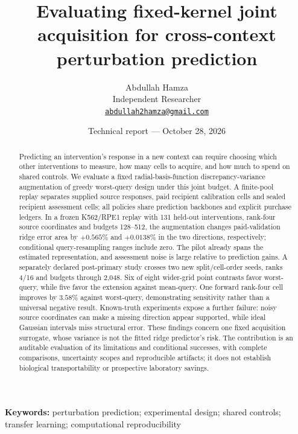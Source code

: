 \documentclass[11pt]{article}
\title{Evaluating fixed-kernel joint acquisition for cross-context perturbation prediction}
\author{Abdullah Hamza\\Independent Researcher\\\href{mailto:abdullah2hamza@gmail.com}{\texttt{abdullah2hamza@gmail.com}}}
\date{Technical report --- October 28, 2026}
\begin{document}
\maketitle
\begin{abstract}
Predicting an intervention's response in a new context can require choosing which other interventions to measure, how many cells to acquire, and how much to spend on shared controls. We evaluate a fixed radial-basis-function discrepancy-variance augmentation of greedy worst-query design under this joint budget. A finite-pool replay separates supplied source responses, paid recipient calibration cells and sealed recipient assessment cells; all policies share prediction backbones and explicit purchase ledgers. In a frozen K562/RPE1 replay with 131 held-out interventions, rank-four source coordinates and budgets 128--512, the augmentation changes paid-validation ridge error area by $+0.565\%$ and $+0.0138\%$ in the two directions, respectively; conditional query-resampling ranges include zero. The pilot already spans the estimated representation, and assessment noise is large relative to prediction gains. A separately declared post-primary study crosses two new split/cell-order seeds, ranks 4/16 and budgets through 2,048. Six of eight wider-grid point contrasts favor worst-query, while five favor the extension against mean-query. One forward rank-four cell improves by $3.58\%$ against worst-query, demonstrating sensitivity rather than a universal negative result. Known-truth experiments expose a further failure: noisy source coordinates can make a missing direction appear supported, while ideal Gaussian intervals miss structural error. These findings concern one fixed acquisition surrogate, whose variance is not the fitted ridge predictor's risk. The contribution is an auditable evaluation of its limitations and conditional successes, with complete comparisons, uncertainty scopes and reproducible artifacts; it does not establish biological transportability or prospective laboratory savings.
\end{abstract}
\noindent\textbf{Keywords:} perturbation prediction; experimental design; shared controls; transfer learning; computational reproducibility






\clearpage

\clearpage


\clearpage
\appendix





\end{document}
